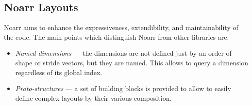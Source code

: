 



\subsection{Noarr Layouts}

Noarr aims to enhance the expressiveness, extendibility, and maintainability of the code. The main points which distinguish Noarr from other libraries are:

\begin{itemize}
  \item \emph{Named dimensions} --- the dimensions are not defined just by an order of shape or stride vectors, but they are named. This allows to query a dimension regardless of its global index.
  \item \emph{Proto-structures} --- a set of building blocks is provided to allow to easily define complex layouts by their various composition.
\end{itemize}

